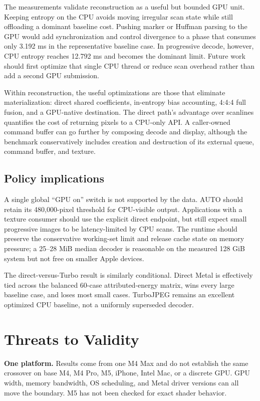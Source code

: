 \documentclass[10pt,twocolumn]{article}
\begin{document}
The measurements validate reconstruction as a useful but bounded GPU unit.
Keeping entropy on the CPU avoids moving irregular scan state while still
offloading a dominant baseline cost.  Pushing marker or Huffman parsing to the
GPU would add synchronization and control divergence to a phase that consumes
only 3.192 ms in the representative baseline case.  In progressive decode,
however, CPU entropy reaches 12.792 ms and becomes the dominant limit.  Future
work should first optimize that single CPU thread or reduce scan overhead
rather than add a second GPU submission.

Within reconstruction, the useful optimizations are those that eliminate
materialization: direct shared coefficients, in-entropy bias accounting,
4:4:4 full fusion, and a GPU-native destination.  The direct path's advantage
over scanlines quantifies the cost of returning pixels to a CPU-only API.  A
caller-owned command buffer can go further by composing decode and display,
although the benchmark conservatively includes creation and destruction of
its external queue, command buffer, and texture.

\subsection{Policy implications}

A single global ``GPU on'' switch is not supported by the data.  AUTO should
retain its 480,000-pixel threshold for CPU-visible output.  Applications with
a texture consumer should use the explicit direct endpoint, but still expect
small progressive images to be latency-limited by CPU scans.  The runtime
should preserve the conservative working-set limit and release cache state on
memory pressure; a 25--28 MiB median decoder is reasonable on the measured
128 GiB system but not free on smaller Apple devices.

The direct-versus-Turbo result is similarly conditional.  Direct Metal is
effectively tied across the balanced 60-case attributed-energy matrix, wins
every large baseline case, and loses most small cases.  TurboJPEG remains an
excellent optimized CPU baseline, not a uniformly superseded decoder.

\section{Threats to Validity}
\label{sec:threats}

\textbf{One platform.}  Results come from one M4 Max and do not establish the
same crossover on base M4, M4 Pro, M5, iPhone, Intel Mac, or a discrete GPU.
GPU width, memory bandwidth, OS scheduling, and Metal driver versions can all
move the boundary.  M5 has not been checked for exact shader behavior.
\end{document}
